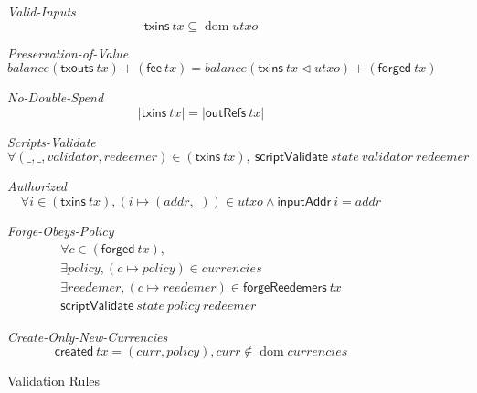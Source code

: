 \documentclass[11pt,a4paper]{article}
\DeclareMathOperator{\dom}{dom}
\newcommand{\restrictdom}{\lhd}
\newcommand{\var}[1]{\mathit{#1}}
\newcommand{\fun}[1]{\mathsf{#1}}
\newcommand{\scriptValidate}[3]{\fun{scriptValidate} ~ \var{#1} ~ \var{#2} ~ \var{#3}}
\newcommand{\inputAddr}[1]{\fun{inputAddr}\ \var{#1}}
\newcommand{\txins}[1]{\fun{txins}\ \var{#1}}
\newcommand{\txouts}[1]{\fun{txouts}\ \var{#1}}
\newcommand{\forged}[1]{\fun{forged}\ \var{#1}}
\newcommand{\forgeReedemers}[1]{\fun{forgeReedemers}\ \var{#1}}
\newcommand{\fee}[1]{\fun{fee}\ \var{#1}}
\newcommand{\created}[1]{\fun{created}\ \var{#1}}
\newcommand{\outRefs}[1]{\fun{outRefs}\ \var{#1}}
\begin{document}
\begin{figure}
\emph{Valid-Inputs}
%
\begin{equation*}
\txins{tx} \subseteq \dom \var{utxo}
\end{equation*}

\emph{Preservation-of-Value}
%
\begin{equation*}
balance (\txouts tx) + (\fee tx)
  = balance (\txins tx \restrictdom utxo) + (\forged tx)
\end{equation*}

\emph{No-Double-Spend}
%
\begin{equation*}
\lvert \txins tx \rvert = \lvert \outRefs tx\rvert
\end{equation*}

\emph{Scripts-Validate}
%
\begin{equation*}
\forall (\_, \_, validator, redeemer)\in(\txins tx),
~ \scriptValidate{state}{validator}{redeemer}
\end{equation*}

\emph{Authorized}
%
\begin{equation*}
  \forall i\in(\txins tx),
  (i \mapsto (addr, \_)) \in \var{utxo} \land \inputAddr i = addr
\end{equation*}

\emph{Forge-Obeys-Policy}
%
\begin{equation*}
\begin{array}{c}
\forall c\in(\forged tx), \\
\exists policy, (c \mapsto policy) \in \var{currencies} \\
\exists reedemer, (c \mapsto reedemer) \in \forgeReedemers tx \\
\scriptValidate{state}{policy}{redeemer}
\end{array}
\end{equation*}

\emph{Create-Only-New-Currencies}
%
\begin{equation*}
\created tx = (curr, policy), curr \notin \dom currencies
\end{equation*}

\caption{Validation Rules}
\label{fig:validation_rules}
\end{figure}
\end{document}
